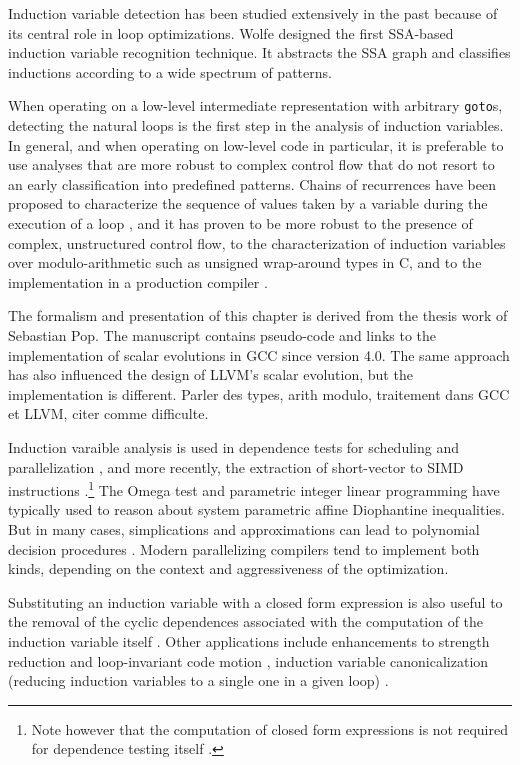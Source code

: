Induction variable detection has been studied extensively in the past
because of its central role in loop optimizations. Wolfe \cite{Wol92}
designed the first SSA-based induction variable recognition
technique. It abstracts the SSA graph and classifies inductions
according to a wide spectrum of patterns.

When operating on a low-level intermediate representation with
arbitrary \texttt{goto}s, detecting the natural loops is the first
step in the analysis of induction variables. In general, and when
operating on low-level code in particular, it is preferable to use
analyses that are more robust to complex control flow that do not
resort to an early classification into predefined patterns.  Chains of
recurrences \cite{BWZ94,KMZ98,Zim01} have been proposed to
characterize the sequence of values taken by a variable during the
execution of a loop \cite{vEn01}, and it has proven to be more robust
to the presence of complex, unstructured control flow, to the
characterization of induction variables over modulo-arithmetic such as
unsigned wrap-around types in C, and to the implementation in a
production compiler \cite{Pop05}.

The formalism and presentation of this chapter is derived from the
thesis work of Sebastian Pop. The manuscript \cite{TPop} contains
pseudo-code and links to the implementation of scalar evolutions in
GCC since version 4.0. The same approach has also influenced the
design of LLVM's scalar evolution, but the implementation is
different.  Parler des types, arith modulo, traitement dans GCC et
LLVM, citer comme difficulte.

Induction varaible analysis is used in dependence tests for scheduling
and parallelization \cite{Wol96}, and more recently, the extraction of
short-vector to SIMD instructions \cite{Nuz06}.\footnote{Note however
  that the computation of closed form expressions is not required for
  dependence testing itself \cite{Wu01}.} The Omega test \cite{Pug91}
and parametric integer linear programming \cite{Fea88b} have typically
used to reason about system parametric affine Diophantine
inequalities. But in many cases, simplications and approximations can
lead to polynomial decision procedures \cite{Ban88}. Modern
parallelizing compilers tend to implement both kinds, depending on the
context and aggressiveness of the optimization.

Substituting an induction variable with a closed form expression is
also useful to the removal of the cyclic dependences associated with
the computation of the induction variable itself \cite{Ger95}. Other
applications include enhancements to strength reduction and
loop-invariant code motion \cite{Ger95}, induction variable
canonicalization (reducing induction variables to a single one in a
given loop) \cite{Liu96}.

